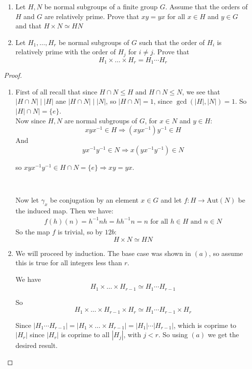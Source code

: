 \begin{exercise}
\begin{enumerate}[label = (\alph*)]
\item Let $H,N$ be normal subgroups of a finite group $G$. Assume that the orders of $H$ and $G$ are relatively prime. Prove that $xy=yx$ for all $x\in H$ and $y\in G$ and that $H\times N\simeq HN$
\item Let $H_1,\ldots,H_r$ be normal subgroups of $G$ such that the order of $H_i$ is relatively prime with the order of $H_j$ for $i\neq j$. Prove that \[H_1\times \ldots \times H_r = H_1\cdots H_r\]
\end{enumerate}
\begin{proof}
\begin{enumerate}[label = (\alph*)]
\item First of all recall that since $H\cap N\leq H$ and $H\cap N\leq N$, we see that $|H\cap N| \mid |H|$ ane $|H\cap N|\mid |N|$, so $|H\cap N| = 1$, since $\gcd(|H|,|N|) = 1$. So $|H|\cap N| = \{e\}$.
\\ 
Now since $H,N$ are normal subgroups of $G$, for $x\in N$ and $y\in H$:\begin{equation*}
xyx^{-1}\in H \Rightarrow (xyx^{-1})y^{-1}\in H
\end{equation*}
And \begin{equation*}
yx^{-1}y^{-1}\in N \Rightarrow x(yx^{-1}y^{-1})\in N
\end{equation*}

so $xyx^{-1}y^{-1}\in H\cap N = \{e\} \Rightarrow xy = yx$.

\

Now let $\gamma_x$ be conjugation by an element $x\in G$ and let $f\colon H\rightarrow \text{Aut}(N)$ be the induced map. Then we have:\begin{align*}
f(h)(n) = h^{-1}nh = hh^{-1}n = n \text{ for all }h\in H \text{ and }n\in N
\end{align*}
So the map $f$ is trivial, so by $12b$:\[H\times N \simeq HN\]
\item  We will proceed by induction. The base case was shown in $(a)$, so assume this is true for all integers less than $r$.

We have \[H_1\times \ldots \times H_{r-1}\simeq H_1\cdots H_{r-1}\]

So \[H_1\times \ldots \times H_{r-1}\times H_r \simeq H_1\cdots H_{r-1}\times H_r \]

Since $|H_1\cdots H_{r-1}| = |H_1\times \ldots \times H_{r-1}| = |H_1| \cdots |H_{r-1}|$, which is coprime to $|H_r|$ since $|H_r|$ is coprime to all $|H_j|$, with $j<r$. So using $(a)$ we get the desired result.
\end{enumerate}
\end{proof}
\end{exercise}
